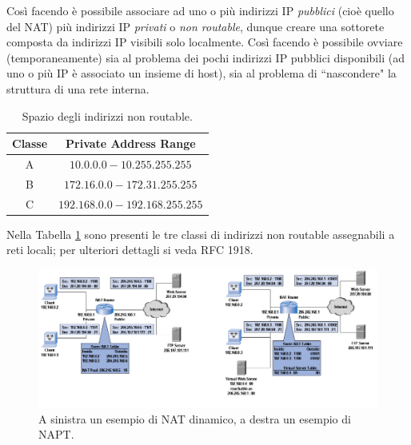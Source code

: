 Così facendo è possibile associare ad uno o più indirizzi IP \textit{pubblici} (cioè quello del NAT) più indirizzi IP \textit{privati} o \textit{non routable}, dunque creare una sottorete composta da indirizzi IP visibili solo localmente. Così facendo è possibile ovviare (temporaneamente) sia al problema dei pochi indirizzi IP pubblici disponibili (ad uno o più IP è associato un insieme di host), sia al problema di \textquotedblleft nascondere" la struttura di una rete interna.
\begin{table}[h]
	\centering
	\begin{tabular}{cc}
		\toprule[0.5ex]
		Classe & Private Address Range \\
		\midrule
		A & $10.0.0.0 - 10.255.255.255$ \\
		B & $172.16.0.0 - 172.31.255.255$ \\
		C & $192.168.0.0 - 192.168.255.255$ \\
		\bottomrule[0.5ex]
	\end{tabular}
	\caption{Spazio degli indirizzi non routable.}
	\label{tab:non-routable-space-address}
\end{table}
Nella Tabella \ref{tab:non-routable-space-address} sono presenti le tre classi di indirizzi non routable assegnabili a reti locali; per ulteriori dettagli si veda RFC 1918.
\begin{figure}
	\centering
	\includegraphics[scale = 0.65]{images/dynamic-NAT}
	\caption{A sinistra un esempio di NAT dinamico, a destra un esempio di NAPT.}
	\label{img:dynamic-NAT}
\end{figure}

